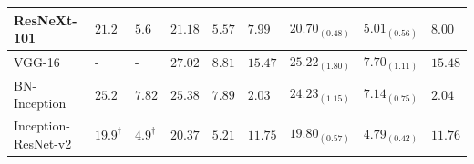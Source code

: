 \begin{table}[t]
\begin{center}
{{\begin{tabular}{l|p{1.2cm}<{\centering}|p{1.2cm}<{\centering}|p{1.2cm}<{\centering}|p{1.2cm}<{\centering}|p{1.2cm}<{\centering}|p{1.6cm}<{\centering}|p{1.6cm}<{\centering}|p{1.2cm}<{\centering}}
ResNeXt-101 \cite{xie_cvpr2017resnext} & $21.2$ & $5.6$ & $21.18$ & $5.57$ & $7.99$ & $20.70_{(0.48)}$ & $5.01_{(0.56)}$ & $8.00$\\
\hline
VGG-16 \cite{simonyan_iclr2015vgg} & - & -  & $27.02$ & $8.81$ & $15.47$ & $25.22_{(1.80)}$  & $7.70_{(1.11)}$ & $15.48$ \\
BN-Inception \cite{ioffe_icml2015bn} & $25.2$ & $7.82$ & $25.38$ & $7.89$ & $2.03$ & $24.23_{(1.15)}$ & $7.14_{(0.75)}$ & $2.04$\\
Inception-ResNet-v2 \cite{szegedy_iclrw2016inceptionv4} & $19.9^\dagger$ & $4.9^\dagger$ & $20.37$ & $5.21$ & $11.75$ & $19.80_{(0.57)}$ & $4.79_{(0.42)}$  & $11.76$\\
\hline
\end{tabular}}}
\end{center}
\end{table}